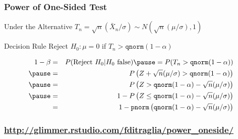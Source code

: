 \documentclass[handout]{beamer}
\begin{document}
\begin{frame}
	\frametitle{Power of One-Sided Test}
\small
\begin{block}
	{Under the Alternative}
	$T_n = \sqrt{n}(\bar{X}_n/\sigma) \sim N\left( \sqrt{n}(\mu/\sigma),1  \right)$
\end{block}
\begin{block}
	{Decision Rule}
	Reject $H_0\colon \mu = 0$ if $T_n> \texttt{qnorm}(1- \alpha)$  
\end{block}
\begin{eqnarray*}
	1 - \beta &=& P(\mbox{Reject } H_0|H_0 \mbox{ false}) \pause = P(T_n >\texttt{qnorm}(1- \alpha))\\ \pause
	&=& P \left( Z + \sqrt{n}(\mu/\sigma) > \texttt{qnorm}(1- \alpha)\right)\\ \pause
	&=& P \left( Z >    \texttt{qnorm}(1- \alpha)-\sqrt{n}(\mu/\sigma)\right)\\ \pause 
	&=& 1 - P \left( Z \leq  \texttt{qnorm}(1- \alpha)-\sqrt{n}(\mu/\sigma)\right) \\
	&=& 1 - \texttt{pnorm}\left( \texttt{qnorm}(1 - \alpha) - \sqrt{n}(\mu/\sigma) \right) 
\end{eqnarray*}

\end{frame}
\begin{frame}
	\frametitle{\href{http://glimmer.rstudio.com/fditraglia/power_oneside/}{http://glimmer.rstudio.com/fditraglia/power\_oneside/}}

\begin{figure}
\end{figure}

\end{frame}
\end{document}
